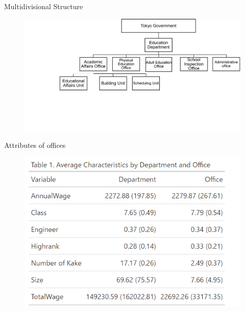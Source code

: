 \begin{frame}{Multidivisional Structure}
    \begin{figure}
        \centering
        \includegraphics[width=1.1\textwidth]{Institutional Background/DeptEducation.png}
        \label{fig:enter-label}
    \end{figure}
\end{frame}

\begin{frame}{Attributes of offices}
     \begin{figure}
         \centering
         \includegraphics[width=\textwidth]{Institutional Background/OfficeAttributes.png}
         \label{fig:enter-label}
     \end{figure}
\end{frame}


